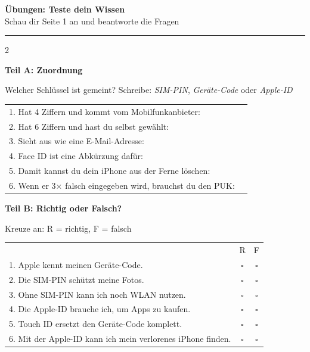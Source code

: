 \documentclass[a4paper,landscape,8pt]{extarticle}
\begin{document}
\newpage


\begin{center}
{\LARGE\bfseries Übungen: Teste dein Wissen}\\[3pt]
{\normalsize Schau dir Seite 1 an und beantworte die Fragen}
\end{center}

\vspace{3mm}
\hrule
\vspace{4mm}

\begin{multicols}{2}

\textbf{\large Teil A: Zuordnung}

Welcher Schlüssel ist gemeint? Schreibe: \textit{SIM-PIN}, \textit{Geräte-Code} oder \textit{Apple-ID}

\vspace{2mm}

\renewcommand{\arraystretch}{1.8}
\begin{tabular}{@{}p{10.5cm}p{3.5cm}@{}}
1. Hat 4 Ziffern und kommt vom Mobilfunkanbieter: & \dotfill \\
2. Hat 6 Ziffern und hast du selbst gewählt: & \dotfill \\
3. Sieht aus wie eine E-Mail-Adresse: & \dotfill \\
4. Face ID ist eine Abkürzung dafür: & \dotfill \\
5. Damit kannst du dein iPhone aus der Ferne löschen: & \dotfill \\
6. Wenn er 3× falsch eingegeben wird, brauchst du den PUK: & \dotfill \\
\end{tabular}
\renewcommand{\arraystretch}{1}

\vspace{6mm}

\textbf{\large Teil B: Richtig oder Falsch?}

Kreuze an: R = richtig, F = falsch

\vspace{2mm}

\renewcommand{\arraystretch}{1.6}
\begin{tabular}{@{}p{10cm}cc@{}}
& R & F \\
1. Apple kennt meinen Geräte-Code. & $\square$ & $\square$ \\
2. Die SIM-PIN schützt meine Fotos. & $\square$ & $\square$ \\
3. Ohne SIM-PIN kann ich noch WLAN nutzen. & $\square$ & $\square$ \\
4. Die Apple-ID brauche ich, um Apps zu kaufen. & $\square$ & $\square$ \\
5. Touch ID ersetzt den Geräte-Code komplett. & $\square$ & $\square$ \\
6. Mit der Apple-ID kann ich mein verlorenes iPhone finden. & $\square$ & $\square$ \\
\end{tabular}
\renewcommand{\arraystretch}{1}


\end{multicols}
\end{document}
